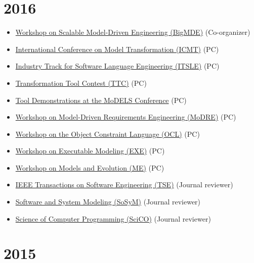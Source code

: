 \hypertarget{section-7}{%
\section{2016}\label{section-7}}

\begin{itemize}
\tightlist
\item
  \href{http://www.big-mde.eu/}{Workshop on Scalable Model-Driven
  Engineering (BigMDE)} (Co-organizer)
\item
  \href{http://is.ieis.tue.nl/research/ICMT16/}{International Conference
  on Model Transformation (ICMT)} (PC)
\item
  \href{http://2016.splashcon.org/track/itsle2016}{Industry Track for
  Software Language Engineering (ITSLE)} (PC)
\item
  \href{http://www.transformation-tool-contest.eu/}{Transformation Tool
  Contest (TTC)} (PC)
\item
  \href{http://models2016.irisa.fr/tool-demonstrations/}{Tool
  Demonstrations at the MoDELS Conference} (PC)
\item
  \href{http://www.modre2016.ece.mcgill.ca/}{Workshop on Model-Driven
  Requirements Engineering (MoDRE)} (PC)
\item
  \href{http://oclworkshop.github.io/2016/news.html}{Workshop on the
  Object Constraint Language (OCL)} (PC)
\item
  \href{http://www.modelexecution.org/?page_id=1743}{Workshop on
  Executable Modeling (EXE)} (PC)
\item
  \href{http://www.models-and-evolution.com/2016/}{Workshop on Models
  and Evolution (ME)} (PC)
\item
  \href{https://www.computer.org/web/tse;jsessionid=6afd856a99689b17c0c58edc329c}{IEEE
  Transactions on Software Engineering (TSE)} (Journal reviewer)
\item
  \href{http://www.sosym.org/}{Software and System Modeling (SoSyM)}
  (Journal reviewer)
\item
  \href{http://www.journals.elsevier.com/science-of-computer-programming/}{Science
  of Computer Programming (SciCO)} (Journal reviewer)
\end{itemize}

\hypertarget{section-8}{%
\section{2015}\label{section-8}}

